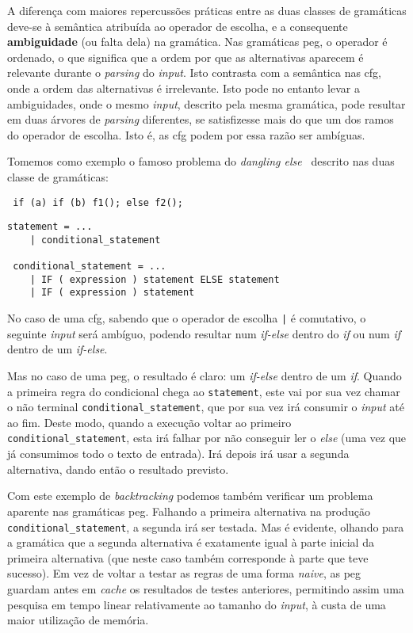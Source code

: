 A diferença com maiores repercussões práticas entre as duas classes de gramáticas deve-se à semântica atribuída ao operador de escolha, e a consequente \textbf{ambiguidade} (ou falta dela) na gramática. Nas gramáticas \acrshort{peg}, o operador é ordenado, o que significa que a ordem por que as alternativas aparecem é relevante durante o \textit{parsing} do \textit{input}. Isto contrasta com a semântica nas \acrshort{cfg}, onde a ordem das alternativas é irrelevante. Isto pode no entanto levar a ambiguidades, onde o mesmo \textit{input}, descrito pela mesma gramática, pode resultar em duas árvores de \textit{parsing} diferentes, se satisfizesse mais do que um dos ramos do operador de escolha. Isto é, as \acrshort{cfg} podem por essa razão ser ambíguas.

Tomemos como exemplo o famoso problema do \textit{dangling else}~\citep{dangling-else} descrito nas duas classe de gramáticas:
\begin{lstlisting}
 if (a) if (b) f1(); else f2();
\end{lstlisting}

\begin{lstlisting}[caption=Gramática,captionpos=t]
 statement = ...
    | conditional_statement
 
 conditional_statement = ...
    | IF ( expression ) statement ELSE statement
    | IF ( expression ) statement
\end{lstlisting}

No caso de uma \acrshort{cfg}, sabendo que o operador de escolha \texttt{|} é comutativo, o seguinte \textit{input} será ambíguo, podendo resultar num \textit{if-else} dentro do \textit{if} ou num \textit{if} dentro de um \textit{if-else}.

Mas no caso de uma \acrshort{peg}, o resultado é claro: um \textit{if-else} dentro de um \textit{if}. Quando a primeira regra do condicional chega ao \texttt{statement}, este vai por sua vez chamar o não terminal \texttt{conditional\_statement}, que por sua vez irá consumir o \textit{input} até ao fim. Deste modo, quando a execução voltar ao primeiro \texttt{conditional\_statement}, esta irá falhar por não conseguir ler o \textit{else} (uma vez que já consumimos todo o texto de entrada). Irá depois irá usar a segunda alternativa, dando então o resultado previsto.

Com este exemplo de \textit{backtracking} podemos também verificar um problema aparente nas gramáticas \acrshort{peg}. Falhando a primeira alternativa na produção \texttt{conditional\_statement}, a segunda irá ser testada. Mas é evidente, olhando para a gramática que a segunda alternativa é exatamente igual à parte inicial da primeira alternativa (que neste caso também corresponde à parte que teve sucesso). Em vez de voltar a testar as regras de uma forma \textit{naive}, as \acrlong{peg} guardam antes em \textit{cache} os resultados de testes anteriores, permitindo assim uma pesquisa em tempo linear relativamente ao tamanho do \textit{input}, à custa de uma maior utilização de memória.

